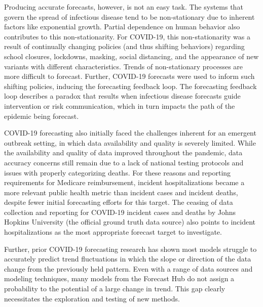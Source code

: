 \documentclass[thesis]{umassthesis}  %
\begin{document}
Producing accurate forecasts, however, is not an easy task. The systems that govern the spread of infectious disease tend to be non-stationary due to inherent factors like exponential growth. Partial dependence on human behavior also contributes to this non-stationarity\cite{lauer}. For COVID-19, this non-stationarity was a result of continually changing policies (and thus shifting behaviors) regarding school closures, lockdowns, masking, social distancing, and the appearance of new variants with different characteristics\cite{cramer}. Trends of non-stationary processes are more difficult to forecast. Further, COVID-19 forecasts were used to inform such shifting policies, inducing the forecasting feedback loop. The forecasting feedback loop describes a paradox that results when infectious disease forecasts guide intervention or risk communication, which in turn impacts the path of the epidemic being forecast\cite{cramer, lauer}.

COVID-19 forecasting also initially faced the challenges inherent for an emergent outbreak setting, in which data availability and quality is severely limited\cite{lauer}. While the availability and quality of data improved throughout the pandemic, data accuracy concerns still remain due to a lack of national testing protocols and issues with properly categorizing deaths\cite{mech_bayes}. For these reasons and reporting requirements for Medicare reimbursement, incident hospitalizations became a more relevant public health metric than incident cases and incident deaths, despite fewer initial forecasting efforts for this target. The ceasing of data collection and reporting for COVID-19 incident cases and deaths by Johns Hopkins University (the official ground truth data source) also points to incident hospitalizations as the most appropriate forecast target to investigate\cite{mech_bayes, jhu_covid, lauer}.

Further, prior COVID-19 forecasting research has shown most models struggle to accurately predict trend fluctuations in which the slope or direction of the data change from the previously held pattern. Even with a range of data sources and modeling techniques, many models from the Forecast Hub do not assign a probability to the potential of a large change in trend\cite{cramer}. This gap clearly necessitates the exploration and testing of new methods.
\end{document}
